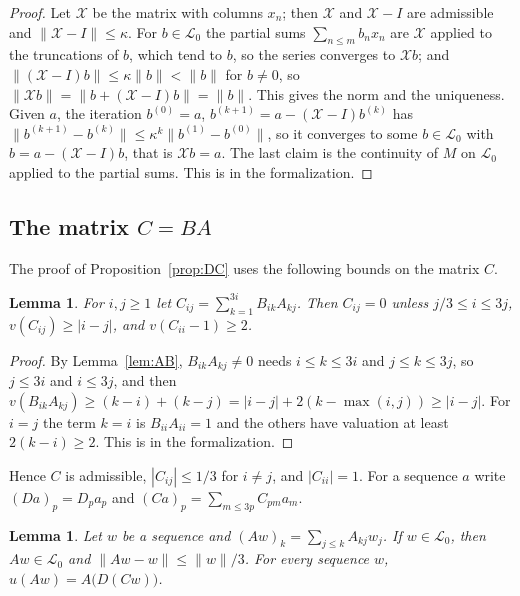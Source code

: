 \documentclass[11pt]{amsart}
\newtheorem{lemma}[theorem]{Lemma}
\theoremstyle{definition}
\numberwithin{equation}{section}
\newcommand{\lean}[1]{\ignorespaces}
\newcommand{\Lc}{\mathcal{L}_0}
\begin{document}
\begin{proof}
Let $\mathcal X$ be the matrix with columns $x_n$; then $\mathcal X$ and $\mathcal X-I$ are admissible and $\|\mathcal X-I\|\le\kappa$. For $b\in\Lc$ the partial sums $\sum_{n\le m}b_nx_n$ are $\mathcal X$ applied to the truncations of $b$, which tend to $b$, so the series converges to $\mathcal Xb$; and $\|(\mathcal X-I)b\|\le\kappa\|b\|<\|b\|$ for $b\ne0$, so $\|\mathcal Xb\|=\|b+(\mathcal X-I)b\|=\|b\|$. This gives the norm and the uniqueness. Given $a$, the iteration $b^{(0)}=a$, $b^{(k+1)}=a-(\mathcal X-I)b^{(k)}$ has $\|b^{(k+1)}-b^{(k)}\|\le\kappa^k\|b^{(1)}-b^{(0)}\|$, so it converges to some $b\in\Lc$ with $b=a-(\mathcal X-I)b$, that is $\mathcal Xb=a$. The last claim is the continuity of $M$ on $\Lc$ applied to the partial sums. This is  in the formalization.
\end{proof}

\subsection{The matrix \texorpdfstring{$C=BA$}{C = BA}}
The proof of Proposition~\ref{prop:DC} uses the following bounds on the matrix $C$.

\begin{lemma}\label{lem:C}\lean{CalegariSlopes.Spectral.norm_Cm_le, CalegariSlopes.Spectral.Cm_eq_zero_of_lt, CalegariSlopes.Spectral.Cm_eq_zero_of_gt, CalegariSlopes.Spectral.norm_Cm_self_sub_one_le}
For $i,j\ge1$ let $C_{ij}=\sum_{k=1}^{3i}B_{ik}A_{kj}$. Then $C_{ij}=0$ unless $j/3\le i\le3j$, $v(C_{ij})\ge|i-j|$, and $v(C_{ii}-1)\ge2$.
\end{lemma}

\begin{proof}
By Lemma~\ref{lem:AB}, $B_{ik}A_{kj}\ne0$ needs $i\le k\le3i$ and $j\le k\le3j$, so $j\le3i$ and $i\le3j$, and then $v(B_{ik}A_{kj})\ge(k-i)+(k-j)=|i-j|+2(k-\max(i,j))\ge|i-j|$. For $i=j$ the term $k=i$ is $B_{ii}A_{ii}=1$ and the others have valuation at least $2(k-i)\ge2$. This is  in the formalization.
\end{proof}

Hence $C$ is admissible, $|C_{ij}|\le1/3$ for $i\ne j$, and $|C_{ii}|=1$. For a sequence $a$ write $(Da)_p=D_pa_p$ and $(Ca)_p=\sum_{m\le3p}C_{pm}a_m$.

\begin{lemma}\label{lem:UA}\lean{CalegariSlopes.Spectral.bact_u_bact_A, CalegariSlopes.Spectral.isC0_bact, CalegariSlopes.Spectral.norm_bact_A_sub_le}
Let $w$ be a sequence and $(Aw)_k=\sum_{j\le k}A_{kj}w_j$. If $w\in\Lc$, then $Aw\in\Lc$ and $\|Aw-w\|\le\|w\|/3$. For every sequence $w$, $u(Aw)=A\bigl(D(Cw)\bigr)$.
\end{lemma}
\end{document}
